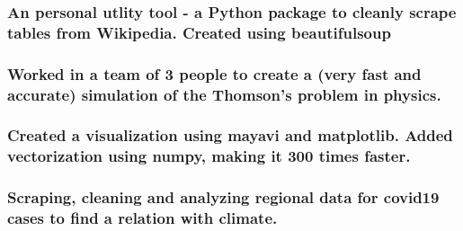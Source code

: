 \documentclass[a4paper]{resume}
\begin{document}
\subsubsection{An personal utlity tool - a Python package to cleanly scrape tables from Wikipedia. Created using beautifulsoup}

\subsubsection{Worked in a team of 3 people to create a (very fast and accurate) simulation of the Thomson's problem in physics.}
\subsubsection{Created a visualization using mayavi and matplotlib. Added vectorization using numpy, making it 300 times faster.}

\subsubsection{Scraping, cleaning and analyzing regional data for covid19 cases to find a relation with climate.}
\end{document}
